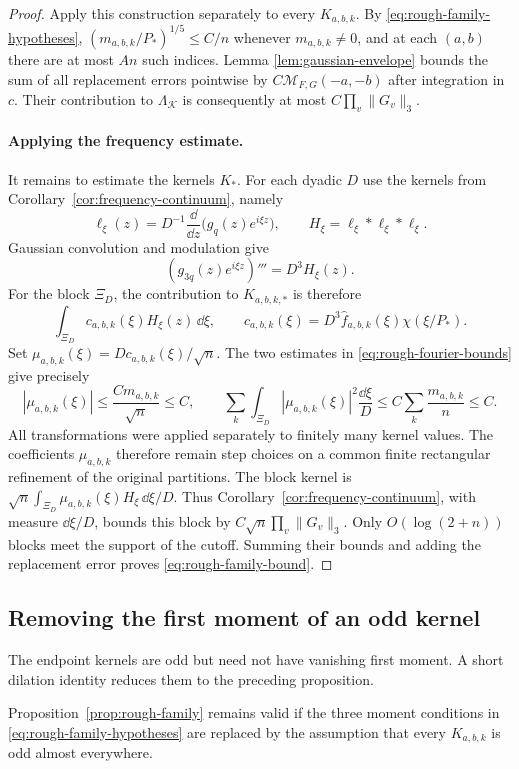\begin{proof}
Apply this construction separately to every $K_{a,b,k}$.
By \eqref{eq:rough-family-hypotheses},
$(m_{a,b,k}/P_*)^{1/5}\le C/n$ whenever $m_{a,b,k}\ne0$, and at
each $(a,b)$ there are at most $An$ such indices.  Lemma
\ref{lem:gaussian-envelope} bounds the sum of all replacement errors
pointwise by $C\mathcal M_{F,G}(-a,-b)$ after integration in $c$.
Their contribution to $\Lambda_{\mathcal K}$ is consequently at most
$C\prod_v\|G_v\|_3$.

\paragraph{Applying the frequency estimate.}
It remains to estimate the kernels $K_*$.  For each dyadic $D$ use
the kernels from Corollary~\ref{cor:frequency-continuum}, namely
\[
 \ell_\xi(z)=D^{-1}\frac{\dd}{\dd z}
                 \bigl(g_q(z)e^{i\xi z}\bigr),
 \qquad H_\xi=\ell_\xi*\ell_\xi*\ell_\xi.
\]
Gaussian convolution and modulation give
\[
 (g_{3q}(z)e^{i\xi z})'''=D^3H_\xi(z).
\]
For the block $\Xi_D$, the contribution to $K_{a,b,k,*}$ is therefore
\[
 \int_{\Xi_D}c_{a,b,k}(\xi)H_\xi(z)\,\dd\xi,
 \qquad
 c_{a,b,k}(\xi)
 =D^3\widehat f_{a,b,k}(\xi)\chi(\xi/P_*).
\]
Set $\mu_{a,b,k}(\xi)=D c_{a,b,k}(\xi)/\sqrt n$.
The two estimates in \eqref{eq:rough-fourier-bounds} give precisely
\[
 |\mu_{a,b,k}(\xi)|
 \le\frac{Cm_{a,b,k}}{\sqrt n}\le C,
 \qquad
 \sum_k\int_{\Xi_D}|\mu_{a,b,k}(\xi)|^2\frac{\dd\xi}{D}
 \le C\sum_k\frac{m_{a,b,k}}n\le C.
\]
All transformations were applied separately to finitely many kernel
values.  The coefficients $\mu_{a,b,k}$ therefore remain step choices
on a common finite rectangular refinement of the original partitions.
The block kernel is $\sqrt n\int_{\Xi_D}\mu_{a,b,k}(\xi)
H_\xi\,\dd\xi/D$.  Thus Corollary~\ref{cor:frequency-continuum},
with measure $\dd\xi/D$, bounds this block by
$C\sqrt n\prod_v\|G_v\|_3$.
Only $O(\log(2+n))$ blocks meet the support of the cutoff.
Summing their bounds and adding the replacement error proves
\eqref{eq:rough-family-bound}.
\end{proof}

\subsection{Removing the first moment of an odd kernel}

The endpoint kernels are odd but need not have vanishing first moment.
A short dilation identity reduces them to the preceding proposition.

\begin{corollary}
\label{cor:odd-family}
Proposition~\ref{prop:rough-family} remains valid if the three moment
conditions in \eqref{eq:rough-family-hypotheses} are replaced by the
assumption that every $K_{a,b,k}$ is odd almost everywhere.
\end{corollary}

